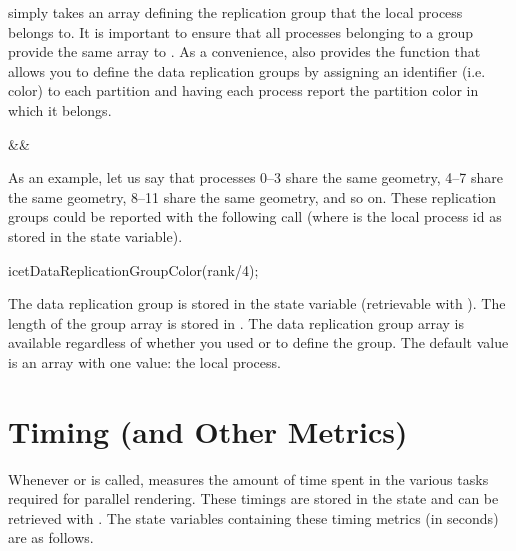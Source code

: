  simply takes an array defining the
replication group that the local process belongs to.  It is important to
ensure that all processes belonging to a group provide the same array to
.  As a convenience, \IceT also provides
the  function that allows you to
define the data replication groups by assigning an identifier (i.e. color)
to each partition and having each process report the partition color in
which it belongs.
\begin{Table}{3}
  \textC{(}&&\quad\textC{);}
\end{Table}

As an example, let us say that processes 0--3 share the same geometry, 4--7
share the same geometry, 8--11 share the same geometry, and so on.  These
replication groups could be reported with the following call (where
 is the local process id as stored in the 
state variable).
\begin{code}
icetDataReplicationGroupColor(rank/4);
\end{code}

The data replication group is stored in the
 state variable (retrievable with
).  The length of the group array is stored in
.  The data replication group
array is available regardless of whether you used
 or 
to define the group.  The default value is an array with one value: the
local process.


\section{Timing (and Other Metrics)}
\label{sec:Customizing_Compositing:Timing}

Whenever  or  is called, \IceT
measures the amount of time spent in the various tasks required for
parallel rendering.  These timings are stored in the \IceT state and can be
retrieved with .  The state variables containing these
timing metrics (in seconds) are as follows.


